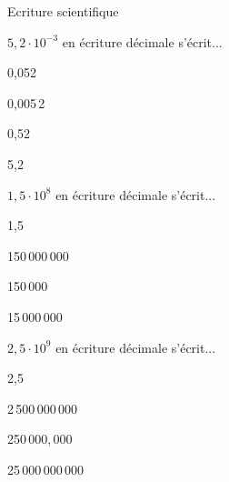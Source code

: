 \documentclass[12pt]{article}
\begin{document}
\begin{quiz}{Ecriture scientifique}
\begin{multi}[points=1]{}
$5,2 \cdot 10^{-3}$ en écriture décimale s'écrit...
\item 0,052
\item * 0,005\,2
\item 0,52
\item 5,2
\end{multi}

\begin{multi}[points=1]{}
$1,5 \cdot 10^{8}$ en écriture décimale s'écrit...
\item 1,5
\item * 150\,000\,000
\item 150\,000
\item 15\,000\,000
\end{multi}

\begin{multi}[points=1]{}
$2,5 \cdot 10^{9}$ en écriture décimale s'écrit...
\item 2,5
\item * 2\,500\,000\,000
\item 250\,000,\,000
\item 25\,000\,000\,000
\end{multi}

\end{quiz}
\end{document}
